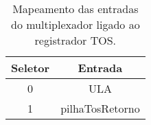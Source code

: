 \begin{table}[]
\centering
\begin{tabular}{|c|c|}
\hline
\textbf{Seletor} & \textbf{Entrada}         \\ \hline
0       & ULA             \\ \hline
1       & pilhaTosRetorno \\ \hline
\end{tabular}
\caption{Mapeamento das entradas do multiplexador ligado ao registrador TOS.}
\label{table_muxTos}
\end{table}